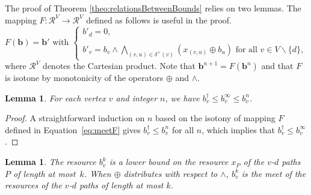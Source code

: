 \documentclass[11pt]{amsart}
\theoremstyle{plain}
\newtheorem{lem}[theo]{Lemma}
\theoremstyle{remark}
\newcommand{\rplus}{\oplus}
\newcommand{\rleq}{\leqslant}
\newcommand{\rset}{\mathcal{R}}
\newcommand{\re}{x}
\newcommand{\meet}{\wedge} \newcommand{\bigmeet}{\bigwedge}
\begin{document}
The proof of Theorem \ref{theo:relationsBetweenBounds} relies on two lemmas. The mapping $F:\rset^{V} \rightarrow  \rset^{V}$ defined as follows is useful in the proof.
\begin{equation}\label{eq:meetF}
F(\mathbf{b}) = \mathbf{b}' \text{ with }\left\{\begin{array}{l}
	b'_{d} = 0, \\
\\
	b'_{v} = \displaystyle b_{v}\meet\bigmeet_{(v,u)\in \delta^{+}(v)}(\re_{(v,u)} \rplus b_{u}) \text{ for all } v\in V\backslash \{d\},
	\end{array}
	\right.
\end{equation}
\noindent where $\rset^{V}$ denotes the Cartesian product. Note that $\mathbf{b}^{n+1} = F\left(\mathbf{b}^{n}\right)$ and that $F$ is isotone by monotonicity of the operators $\rplus$ and $\meet$.

\begin{lem}\label{lem:meetEqSolSmallerThanSeq}
For each vertex $v$ and integer $n$, we have $b_{v}^{\dagger} \rleq b_{v}^{\infty} \rleq b_{v}^{n}$.
\end{lem}
\begin{proof}
A straightforward induction on $n$ based on the isotony of mapping $F$ defined in Equation~\eqref{eq:meetF} gives $b_{v}^{\dagger} \rleq b_{v}^{n}$ for all $n$, which implies that $b_{v}^{\dagger} \rleq b_{v}^{\infty}$.
\end{proof}

\begin{lem}\label{lem:meetSeqAndPathsResources}
The resource $b_{v}^{k}$ is a lower bound on the resource $\re_{P}$ of the $v$-$d$ paths $P$ of length at most~$k$. 
When $\rplus$ distributes with respect to $\meet$, $b_{v}^{k}$ is the meet of the resources of the $v$-$d$ paths of length at most $k$. 
\end{lem}
\end{document}
